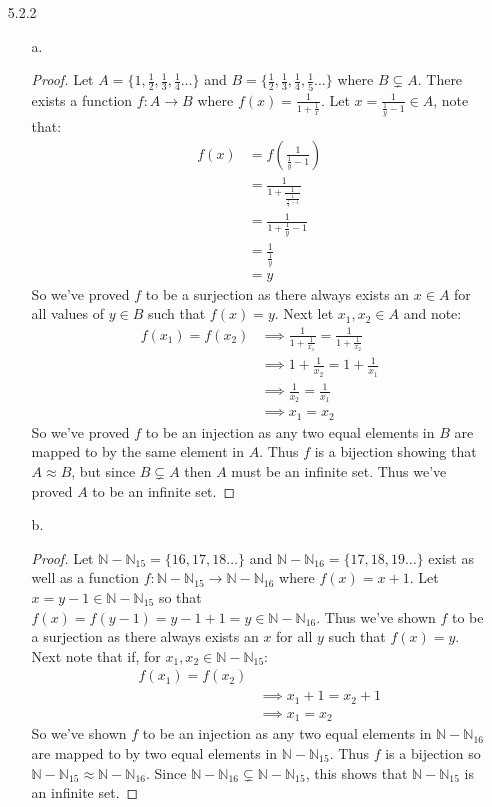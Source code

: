 \documentclass[11pt]{amsart}
\theoremstyle{definition}
\begin{document}
\begin{itemize}
\item[5.2.2]
\begin{itemize}
	\item[a.] \begin{proof}
			Let $A=\{1,\frac12,\frac13,\frac14\ldots\}$ and $B=\{\frac12,\frac13,\frac14,\frac15\ldots\}$ where $B\subsetneq A$. There exists a function $f:A\to B$ where $f(x)=\frac 1{1+\frac1x}$. Let $x=\frac1{\frac1y-1}\in A$, note that:
			\begin{align*}
				f(x)
				&=f(\frac1{\frac1y-1}) \\
				&=\frac1{1+\frac1{\frac1{\frac1y-1}}} \\
				&=\frac1{1+\frac1y-1} \\
				&=\frac1{\frac1y} \\
				&=y
			\end{align*}
			So we've proved $f$ to be a surjection as there always exists an $x\in A$ for all values of $y\in B$ such that $f(x)=y$. Next let $x_1,x_2\in A$ and note:
			\begin{align*}
				f(x_1)=f(x_2)
				&\implies\frac1{1+\frac1{x_1}}=\frac1{1+\frac1{x_2}} \\
				&\implies1+\frac1{x_2}=1+\frac1{x_1}\\
				&\implies \frac1{x_2}=\frac1{x_1}\\
				&\implies x_1=x_2
			\end{align*}
			So we've proved $f$ to be an injection as any two equal elements in $B$ are mapped to by the same element in $A$. Thus $f$ is a bijection showing that $A\approx B$, but since $B\subsetneq A$ then $A$ must be an infinite set. Thus we've proved $A$ to be an infinite set.
	\end{proof}

	\item[b.] \begin{proof}
		Let $\mathbb{N}-\mathbb{N}_{15}=\{16,17,18\ldots\}$ and $\mathbb{N}-\mathbb{N}_{16}=\{17,18,19\ldots\}$ exist as well as a function $f:\mathbb{N}-\mathbb{N}_{15}\to\mathbb{N}-\mathbb{N}_{16}$ where $f(x)=x+1$. Let $x=y-1\in\mathbb{N}-\mathbb{N}_{15}$ so that $f(x)=f(y-1)=y-1+1=y\in\mathbb{N}-\mathbb{N}_{16}$. Thus we've shown $f$ to be a surjection as there always exists an $x$ for all $y$ such that $f(x)=y$. Next note that if, for $x_1,x_2\in\mathbb{N}-\mathbb{N}_{15}$:
		\begin{align*}
			f(x_1)=f(x_2) \\
			&\implies x_1+1=x_2+1\\
			&\implies x_1=x_2
		\end{align*}
		So we've shown $f$ to be an injection as any two equal elements in $\mathbb{N}-\mathbb{N}_{16}$ are mapped to by two equal elements in $\mathbb{N}-\mathbb{N}_{15}$. Thus $f$ is a bijection so $\mathbb{N}-\mathbb{N}_{15}\approx\mathbb{N}-\mathbb{N}_{16}$. Since $\mathbb{N}-\mathbb{N}_{16}\subsetneq \mathbb{N}-\mathbb{N}_{15}$, this shows that $\mathbb{N}-\mathbb{N}_{15}$ is an infinite set.
	\end{proof}


\end{itemize}
\end{itemize}
\end{document}
